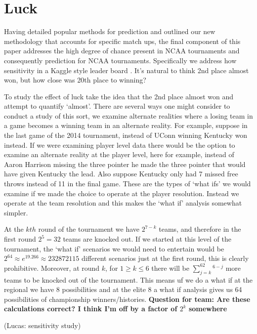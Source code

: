 \section{Luck}
Having detailed popular methods for prediction and outlined our new methodology that accounts for specific match ups, the final component of this paper addresses the high degree of chance present in NCAA tournaments and consequently prediction for NCAA tournaments.  Specifically we address how sensitivity in a Kaggle style leader board . It's natural to think 2nd place almost won, but how close was 20th place to winning? 


To study the effect of luck take the idea that the 2nd place almost won and attempt to quantify `almost'. There are several ways one might consider to conduct a study of this sort, we examine alternate realities where a losing team in a game becomes a winning team in an alternate reality. For example, suppose in the last game of the 2014 tournament, instead of UConn winning Kentucky won instead. If we were examining player level data there would be the option to examine an alternate reality at the player level, here for example, instead of Aaron Harrison missing the three pointer he made the three pointer that would have given Kentucky the lead. Also suppose Kentucky only had 7 missed free throws instead of 11 in the final game. These are the types of `what ifs' we would examine if we made the choice to operate at the player resolution. Instead we operate at the team resolution and this makes the `what if' analysis somewhat simpler. 

At the $kth$ round of the tournament we have $2^{7-k}$ teams, and therefore in the first round $2^5 = 32$ teams are knocked out. If we started at this level of the tournament, the `what if' scenarios we would need to entertain would be $2^64 \approx e^{19.266}\approx 232872115$ different scenarios just at the first round, this is clearly prohibitive. Moreover, at round $k$, for $1\geq k \leq 6$ there will be $\sum_{j=k}^62^{6-j}$ more teams to be knocked out of the tournament. This means uf we do a what if at the regional we have 8 possibilities and at the elite 8 a what if analysis gives us 64 possibilities of championship winners/histories. \textbf{Question for team: Are these calculations correct? I think I'm off by a factor of $2^k$ somewhere}


(Lucas: sensitivity study)
